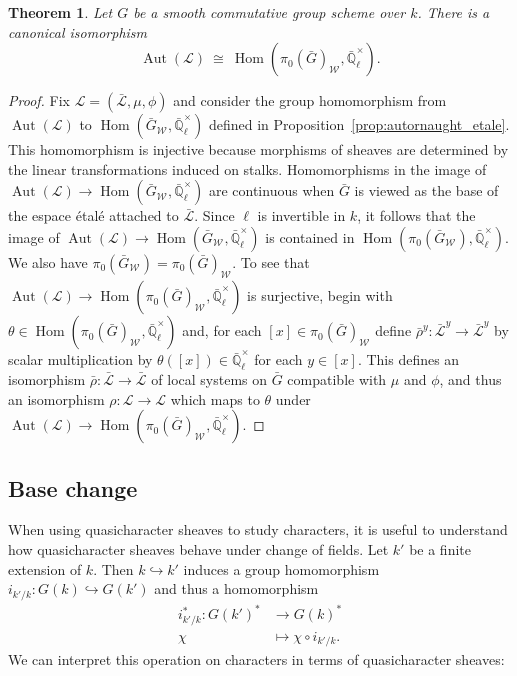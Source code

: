 \documentclass[CM,Submssn,SecEq]{degruyter-crelle} %
\theoremstyle{plain}
\newtheorem{theorem}{Theorem}[section]
\theoremstyle{definition}
\theoremstyle{remark}
\newcommand{\EE}{\mathbb{\bar Q}_\ell}
\newcommand{\Fq}{k}
\newcommand{\EEx}{\EE^\times}
\newcommand{\Weil}[1]{\mathcal{W}_{#1}}
\DeclareMathOperator{\Aut}{Aut}
\DeclareMathOperator{\Hom}{Hom}
\newcommand{\iso}{{\ \cong\ }}
\newcommand{\qcs}[1]{{\mathcal{#1}}}
\newcommand{\gqcs}[1]{{\mathcal{\bar #1}}}
\newcommand{\bG}{\bar{G}}
\begin{document}
\begin{theorem}\label{thm:autornaught}
Let $G$ be a smooth commutative group scheme over $\Fq$.
There is a canonical isomorphism
\[
\Aut(\qcs{L}) \iso \Hom(\pi_0(\bG)_{\Weil{}},\EEx).
\]
\end{theorem}
\begin{proof} 
Fix $\qcs{L} = (\gqcs{L},\mu,\phi)$ and consider the group homomorphism from $\Aut(\qcs{L})$ to $\Hom(\bG_{\Weil{}},\EEx)$ defined in Proposition~\ref{prop:autornaught_etale}.
This homomorphism is injective because morphisms of sheaves are determined by the linear transformations induced on stalks.  
Homomorphisms in the image of $\Aut(\qcs{L}) \to \Hom(\bG_{\Weil{}},\EEx)$ are continuous when $\bG$ is viewed as the base of the espace \'etal\'e attached to $\gqcs{L}$.
Since $\ell$ is invertible in $\Fq$, it follows that the image of $\Aut(\qcs{L}) \to \Hom(\bG_{\Weil{}},\EEx)$ is contained in $\Hom(\pi_0(\bG_{\Weil{}}),\EEx)$. 
We also have $\pi_0(\bG_{\Weil{}})=\pi_0(\bG)_{\Weil{}}$. 
To see that $\Aut(\qcs{L}) \to \Hom(\pi_0(\bG)_{\Weil{}},\EEx)$ is surjective, begin with $\theta\in\Hom(\pi_0(\bG)_{\Weil{}},\EEx)$ and, for each $[x] \in \pi_0(\bG)_{\Weil{}}$ define $\bar\rho^y: \gqcs{L}^y \to \gqcs{L}^y$ by scalar multiplication by $\theta([x])\in \EEx$ for each $y\in [x]$.
This defines an isomorphism $\bar\rho : \gqcs{L}\to \gqcs{L}$ of local systems on $\bG$ compatible with $\mu$ and $\phi$, and thus an isomorphism $\rho :\qcs{L}\to \qcs{L}$ which maps to $\theta$ under $\Aut(\qcs{L}) \to \Hom(\pi_0(\bG)_{\Weil{}},\EEx)$.
\end{proof}

\subsection{Base change}\label{ssec:basechange}

When using quasicharacter sheaves to study characters, it is useful to understand
how quasicharacter sheaves behave under change of fields.
Let $k'$ be a finite extension of $k$. Then $k \hookrightarrow k'$ induces a group homomorphism
$i_{k'/k} : G(k) \hookrightarrow G(k')$ and thus a homomorphism
\begin{align*}
i_{k'/k}^* : G(k')^* &\to G(k)^* \\
\chi &\mapsto \chi\circ i_{k'/k}.
\end{align*}
We can interpret this operation on characters in terms of quasicharacter sheaves:
\end{document}

